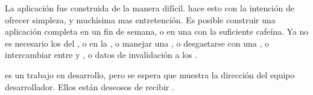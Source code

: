 La aplicación fue construida de la manera difícil. \meteor hace esto con la intención de ofrecer simpleza, y muchísima mas entretención. Es posible construir una aplicación completa en un fin de semana, o en una \hackathonCPT con la suficiente cafeína. Ya no es necesario los \resources del \serverAS, o \deploy \api \apiendpoints en la \cloud, o manejar una \dataBase, o desgastarse con una \orm \layer, o intercambiar \backandforth entre \javaScriptNAME y \ruby, o \broadcast datos de invalidación a los \clientsAS.

\meteor es un trabajo en desarrollo, pero se espera que muestra la dirección del equipo desarrollador. Ellos están deseosos de recibir \feedback. 

